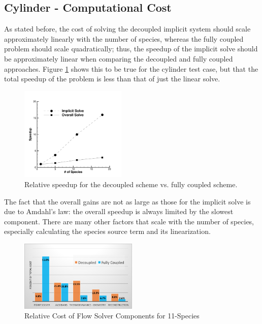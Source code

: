 \subsection{Cylinder - Computational Cost}
\label{sec:cylinder-comp-cost}

As stated before, the cost of solving the decoupled implicit system should scale
approximately linearly with the number of species, whereas the fully coupled
problem should scale quadratically; thus, the speedup of the implicit solve
should be approximately linear when comparing the decoupled and fully coupled
approaches.  Figure \ref{rel_speedup} shows this to be true for the cylinder test
case, but that the total speedup of the problem is less than that of just
the linear solve.
\begin{figure}[h]
  \centering
  \includegraphics[width=0.45\textwidth]{figures/scitech/speedup} 
  \caption{ Relative speedup for the decoupled scheme vs. fully coupled scheme.}
  \label{rel_speedup} 
\end{figure}
The fact that the overall gains are not as large as those for the implicit
solve is due to Amdahl's law: the overall speedup is always limited by the
slowest component.  There are many other factors that scale with the number of
species, especially calculating the species source term and its linearization.
\begin{figure}[h]
  \centering
  \includegraphics[width=0.5\textwidth]{figures/flow-efficiency/percent-cost.png}
  \caption{Relative Cost of Flow Solver Components for 11-Species}
  \label{fig:percent-cost-cyl}
\end{figure}
